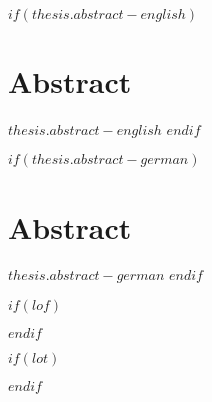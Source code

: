 ~
\thispagestyle{empty}
\clearpage



$if(thesis.abstract-english)$
\section*{\sffamily Abstract}
\normalsize{$thesis.abstract-english$}
\vspace*{\baselineskip}
\clearpage
$endif$


$if(thesis.abstract-german)$
\clearpage
\section*{\sffamily Abstract}
\normalsize{$thesis.abstract-german$}
\clearpage
$endif$



$if(lof)$
    \listoffigures
$endif$




$if(lot)$
    \listoftables
$endif$

